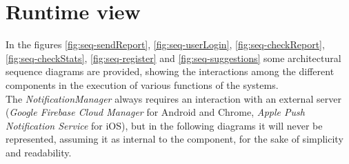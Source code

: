 \documentclass[a4paper]{report}
\begin{document}
\section{Runtime view}
In the figures \ref{fig:seq-sendReport}, \ref{fig:seq-userLogin}, \ref{fig:seq-checkReport}, \ref{fig:seq-checkStats}, \ref{fig:seq-register} and \ref{fig:seq-suggestions} some architectural sequence diagrams are provided, showing the interactions among the different components in the execution of various functions of the systems. \\
The \textit{NotificationManager} always requires an interaction with an external server (\textit{Google Firebase Cloud Manager} for Android and Chrome, \textit{Apple Push Notification Service} for iOS), but in the following diagrams it will never be represented, assuming it as internal to the component, for the sake of simplicity and readability. 
\\\\
\end{document}
